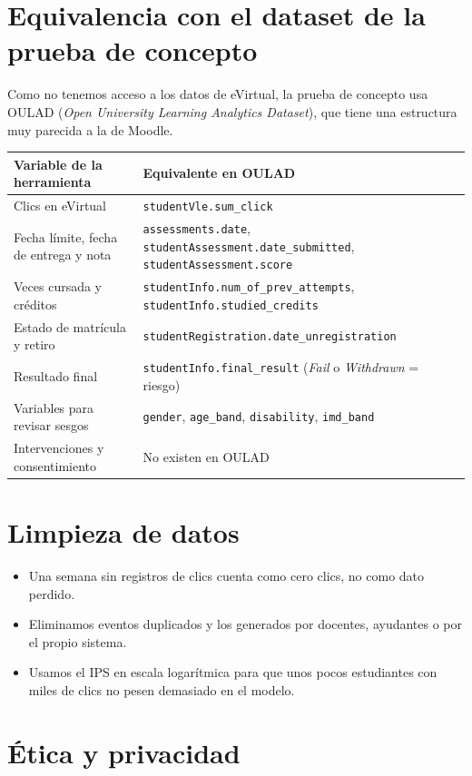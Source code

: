 \documentclass[10pt]{article}
\begin{document}
\section{Equivalencia con el dataset de la prueba de concepto}

Como no tenemos acceso a los datos de eVirtual, la prueba de concepto usa OULAD (\emph{Open University Learning Analytics Dataset}), que tiene una estructura muy parecida a la de Moodle.

{\small
\begin{longtable}{P{8cm} P{12cm}}
\toprule
\textbf{Variable de la herramienta} & \textbf{Equivalente en OULAD}\\
\midrule
Clics en eVirtual & \texttt{studentVle.sum\_click}\\
Fecha límite, fecha de entrega y nota & \texttt{assessments.date}, \texttt{studentAssessment.date\_submitted}, \texttt{studentAssessment.score}\\
Veces cursada y créditos & \texttt{studentInfo.num\_of\_prev\_attempts}, \texttt{studentInfo.studied\_credits}\\
Estado de matrícula y retiro & \texttt{studentRegistration.date\_unregistration}\\
Resultado final & \texttt{studentInfo.final\_result} (\emph{Fail} o \emph{Withdrawn} = riesgo)\\
Variables para revisar sesgos & \texttt{gender}, \texttt{age\_band}, \texttt{disability}, \texttt{imd\_band}\\
Intervenciones y consentimiento & No existen en OULAD\\
\bottomrule
\end{longtable}
}

\section{Limpieza de datos}
\begin{itemize}
\item Una semana sin registros de clics cuenta como cero clics, no como dato perdido.
\item Eliminamos eventos duplicados y los generados por docentes, ayudantes o por el propio sistema.
\item Usamos el IPS en escala logarítmica para que unos pocos estudiantes con miles de clics no pesen demasiado en el modelo.
\end{itemize}

\section{Ética y privacidad}
\end{document}
